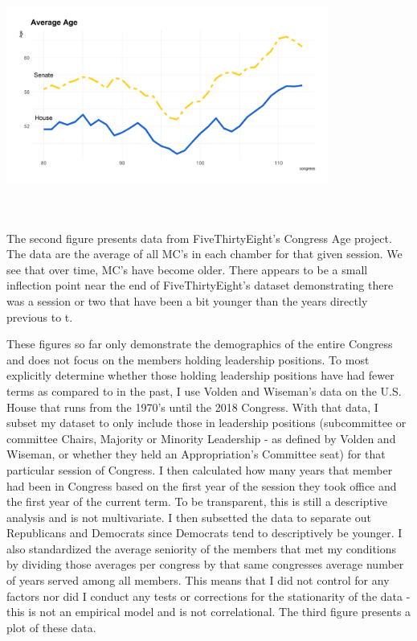 \documentclass [12pt]{article}
\begin{document}
\includegraphics[height=300, width=400]{../figures/age-over-time}

The second figure presents data from FiveThirtyEight's Congress Age project. The data are the average of all MC's in each chamber for that given session. We see that over time, MC's have become older. There appears to be a small inflection point near the end of FiveThirtyEight's dataset demonstrating there was a session or two that have been a bit younger than the years directly previous to t.

These figures so far only demonstrate the demographics of the entire Congress and does not focus on the members holding leadership positions. To most explicitly determine whether those holding leadership positions have had fewer terms as compared to in the past, I use Volden and Wiseman's data on the U.S. House that runs from the 1970's until the 2018 Congress. With that data, I subset my dataset to only include those in leadership positions (subcommittee or committee Chairs, Majority or Minority Leadership - as defined by Volden and Wiseman, or whether they held an Appropriation's Committee seat) for that particular session of Congress. I then calculated how many years that member had been in Congress based on the first year of the session they took office and the first year of the current term. To be transparent, this is still a descriptive analysis and is not multivariate. I then subsetted the data to separate out Republicans and Democrats since Democrats tend to descriptively be younger. I also standardized the average seniority of the members that met my conditions by dividing those averages per congress by that same congresses average number of years served among all members. This means that I did not control for any factors nor did I conduct any tests or corrections for the stationarity of the data - this is not an empirical model and is not correlational. The third figure presents a plot of these data.
\end{document}
